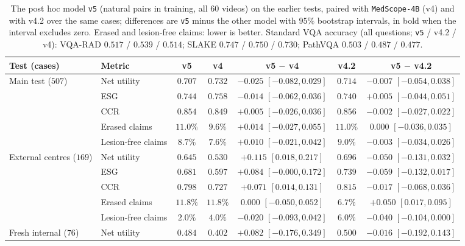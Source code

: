 \documentclass[5p,times,twocolumn,authoryear]{elsarticle}
\begin{document}
\begin{table}[!htbp]
\caption{The post hoc model \texttt{v5} (natural pairs in training, all $60$ videos) on the earlier tests, paired with \texttt{MedScope-4B} (v4) and with v4.2 over the same cases; differences are \texttt{v5} minus the other model with $95\%$ bootstrap intervals, in bold when the interval excludes zero. Erased and lesion-free claims: lower is better. Standard VQA accuracy (all questions; \texttt{v5} / v4.2 / v4): VQA-RAD $0.517$ / $0.539$ / $0.514$; SLAKE $0.747$ / $0.750$ / $0.730$; PathVQA $0.503$ / $0.487$ / $0.477$.}
\label{tab:v5_other}
\begin{center}
\small
\begin{adjustbox}{max width=\linewidth}
\begin{tabular}{llccccc}
\toprule
\textbf{Test (cases)} & \textbf{Metric} & \textbf{v5} & \textbf{v4} & \textbf{v5 $-$ v4} & \textbf{v4.2} & \textbf{v5 $-$ v4.2} \\
\midrule
Main test ($507$) & Net utility & $0.707$ & $0.732$ & $-0.025$ $[-0.082, 0.029]$ & $0.714$ & $-0.007$ $[-0.054, 0.038]$ \\
 & ESG & $0.744$ & $0.758$ & $-0.014$ $[-0.062, 0.036]$ & $0.740$ & $+0.005$ $[-0.044, 0.051]$ \\
 & CCR & $0.854$ & $0.849$ & $+0.005$ $[-0.026, 0.036]$ & $0.856$ & $-0.002$ $[-0.027, 0.022]$ \\
 & Erased claims & $11.0\%$ & $9.6\%$ & $+0.014$ $[-0.027, 0.055]$ & $11.0\%$ & $0.000$ $[-0.036, 0.035]$ \\
 & Lesion-free claims & $8.7\%$ & $7.6\%$ & $+0.010$ $[-0.021, 0.042]$ & $9.0\%$ & $-0.003$ $[-0.034, 0.026]$ \\
\midrule
External centres ($169$) & Net utility & $0.645$ & $0.530$ & $\mathbf{+0.115}$ $\mathbf{[0.018, 0.217]}$ & $0.696$ & $-0.050$ $[-0.131, 0.032]$ \\
 & ESG & $0.681$ & $0.597$ & $+0.084$ $[-0.000, 0.172]$ & $0.739$ & $-0.059$ $[-0.132, 0.017]$ \\
 & CCR & $0.798$ & $0.727$ & $\mathbf{+0.071}$ $\mathbf{[0.014, 0.131]}$ & $0.815$ & $-0.017$ $[-0.068, 0.036]$ \\
 & Erased claims & $11.8\%$ & $11.8\%$ & $0.000$ $[-0.050, 0.052]$ & $6.7\%$ & $\mathbf{+0.050}$ $\mathbf{[0.017, 0.095]}$ \\
 & Lesion-free claims & $2.0\%$ & $4.0\%$ & $-0.020$ $[-0.093, 0.042]$ & $6.0\%$ & $-0.040$ $[-0.104, 0.000]$ \\
\midrule
Fresh internal ($76$) & Net utility & $0.484$ & $0.402$ & $+0.082$ $[-0.176, 0.349]$ & $0.500$ & $-0.016$ $[-0.192, 0.143]$ \\

\end{tabular}
\end{adjustbox}
\end{center}
\end{table}
\end{document}
